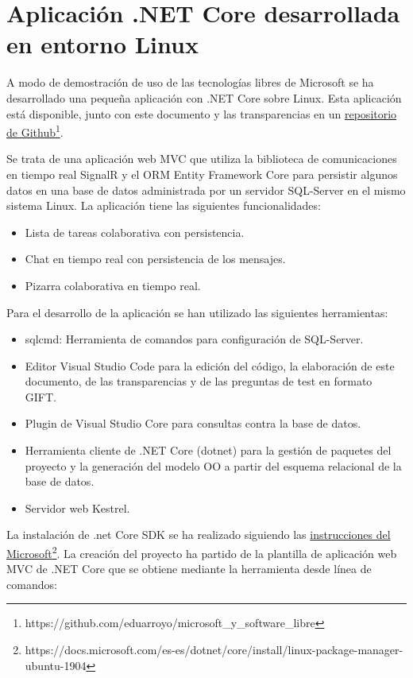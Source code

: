 \section{Aplicación .NET Core desarrollada en entorno Linux}
A modo de demostración de uso de las tecnologías libres de Microsoft se ha desarrollado una pequeña aplicación con .NET Core sobre Linux. Esta aplicación está disponible, junto con este documento y las transparencias en un \href{https://github.com/eduarroyo/microsoft_y_software_libre}{repositorio de Github}\footnote{https://github.com/eduarroyo/microsoft\_y\_software\_libre}.

Se trata de una aplicación web MVC que utiliza la biblioteca de comunicaciones en tiempo real SignalR y el ORM Entity Framework Core para persistir algunos datos en una base de datos administrada por un servidor SQL-Server en el mismo sistema Linux. La aplicación tiene las siguientes funcionalidades:

\begin{itemize}
    \item Lista de tareas colaborativa con persistencia.
    \item Chat en tiempo real con persistencia de los mensajes.
    \item Pizarra colaborativa en tiempo real.
\end{itemize}

Para el desarrollo de la aplicación se han utilizado las siguientes herramientas:
\begin{itemize}
    \item sqlcmd: Herramienta de comandos para configuración de SQL-Server.
    \item Editor Visual Studio Code para la edición del código, la elaboración de este documento, de las transparencias y de las preguntas de test en formato GIFT.
    \item Plugin de Visual Studio Core para consultas contra la base de datos.
    \item Herramienta cliente de .NET Core (dotnet) para la gestión de paquetes del proyecto y la generación del modelo OO a partir del esquema relacional de la base de datos.
    \item Servidor web Kestrel.
\end{itemize}

La instalación de .net Core SDK se ha realizado siguiendo las \href{https://docs.microsoft.com/es-es/dotnet/core/install/linux-package-manager-ubuntu-1904}{instrucciones del Microsoft}\footnote{https://docs.microsoft.com/es-es/dotnet/core/install/linux-package-manager-ubuntu-1904}. La creación del proyecto ha partido de la plantilla de aplicación web MVC de .NET Core que se obtiene mediante la herramienta  desde línea de comandos:

